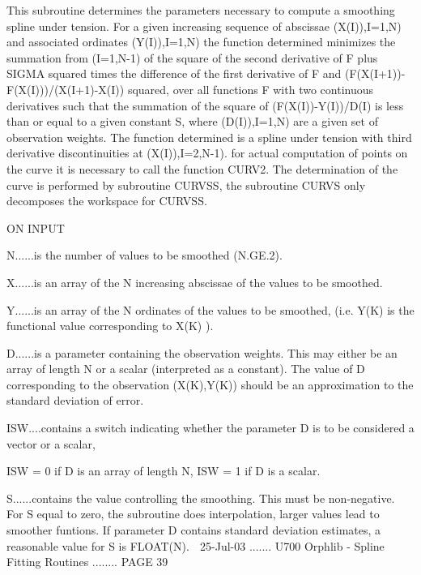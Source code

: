    This  subroutine determines the parameters necessary to compute a smoothing
   spline  under  tension.  For  a  given  increasing  sequence  of  abscissae
   (X(I)),I=1,N)  and  associated   ordinates   (Y(I)),I=1,N)   the   function
   determined  minimizes  the  summation  from  (I=1,N-1) of the square of the
   second derivative of F plus SIGMA  squared  times  the  difference  of  the
   first  derivative  of F and (F(X(I+1))-F(X(I)))/(X(I+1)-X(I)) squared, over
   all functions F with two continuous derivatives such that the summation  of
   the  square  of  (F(X(I))-Y(I))/D(I)  is  less  than  or  equal  to a given
   constant S, where (D(I)),I=1,N) are a given set of observation weights. The
   function determined  is  a  spline  under  tension  with  third  derivative
   discontinuities  at  (X(I)),I=2,N-1).  for  actual computation of points on
   the curve it is necessary to call the function CURV2. The determination  of
   the  curve  is  performed  by  subroutine CURVSS, the subroutine CURVS only
   decomposes the workspace for CURVSS.
 
                                    ON INPUT
 
   N......is the number of values to be smoothed (N.GE.2).
 
   X......is an array of the N  increasing  abscissae  of  the  values  to  be
          smoothed.
 
   Y......is  an  array of the N ordinates of the values to be smoothed, (i.e.
          Y(K) is the functional value corresponding to X(K) ).
 
   D......is a parameter containing the observation weights. This  may  either
          be  an  array  of  length N or a scalar (interpreted as a constant).
          The value of D corresponding to the observation  (X(K),Y(K))  should
          be an approximation to the standard deviation of error.
 
   ISW....contains  a  switch  indicating  whether  the  parameter  D is to be
          considered a vector or a scalar,
 
          ISW = 0 if D is an array of length N,
          ISW = 1 if D is a scalar.
 
   S......contains   the   value  controlling  the  smoothing.  This  must  be
          non-negative.   For   S   equal   to   zero,   the  subroutine  does
          interpolation,   larger   values   lead  to  smoother  funtions.  If
          parameter D contains  standard  deviation  estimates,  a  reasonable
          value for S is FLOAT(N).
    
   25-Jul-03 ....... U700  Orphlib - Spline Fitting Routines ........ PAGE  39
 
